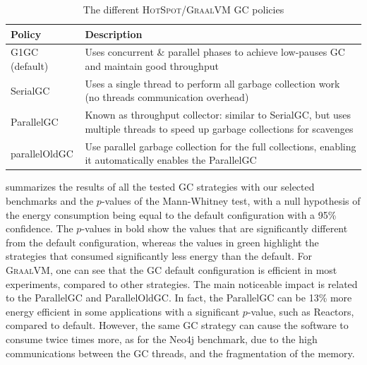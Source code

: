 \begin{table}
    \centering
    \caption{The different \textsc{HotSpot}/\textsc{GraalVM} GC policies}
    \label{table:GCHS}
    \small
    \begin{tabular}{|p{}|p{}|}
        \hline
        \textbf{Policy}          & \textbf{Description}                                                                                                                 \\
        \hline
        \hline
        \textsf{G1GC}\,(default) & Uses concurrent \& parallel phases to achieve low-pauses GC and maintain good throughput                                             \\
        \hline
        \textsf{SerialGC}        & Uses a single thread to perform all garbage collection work (no threads communication overhead)                                      \\
        \hline
        \textsf{ParallelGC}      & Known as throughput collector: similar to \textsf{SerialGC}, but uses multiple threads to speed up garbage collections for scavenges \\
        \hline
        \textsf{parallelOldGC}   & Use parallel garbage collection for the full collections, enabling it automatically enables the \textsf{ParallelGC}                  \\
        \hline
    \end{tabular}
\end{table}



 summarizes the results of all the tested GC strategies with our selected benchmarks and the $p$-values of the Mann-Whitney test, with a null hypothesis of the energy consumption being equal to the default configuration with a 95\% confidence.
The $p$-values in bold show the values that are significantly different from the default configuration, whereas the values in green highlight the strategies that consumed significantly less energy than the default.
For \textsc{GraalVM}, one can see that the GC default configuration is efficient in most experiments, compared to other strategies.
The main noticeable impact is related to the \textsf{ParallelGC} and \textsf{ParallelOldGC}.
In fact, the \textsf{ParallelGC} can be 13\% more energy efficient in some applications with a significant $p$-value, such as \textsf{Reactors}, compared to default.
However, the same GC strategy can cause the software to consume twice times more, as for the \textsf{Neo4j} benchmark, due to the high communications between the GC threads, and the fragmentation of the memory.

